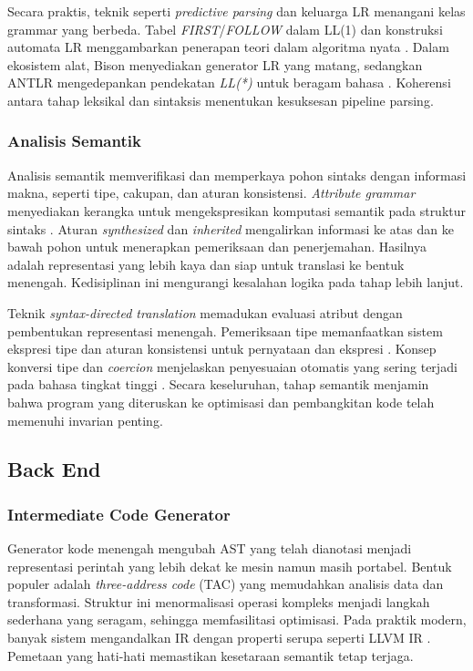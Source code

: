 \documentclass[../main.tex]{subfiles}
\begin{document}
Secara praktis, teknik seperti \emph{predictive parsing} dan keluarga LR menangani kelas grammar yang berbeda. Tabel \emph{FIRST}/\emph{FOLLOW} dalam LL(1) dan konstruksi automata LR menggambarkan penerapan teori dalam algoritma nyata \citep{WikiFirstFollow,WikiSLR,WikiLALR}. Dalam ekosistem alat, Bison menyediakan generator LR yang matang, sedangkan ANTLR mengedepankan pendekatan \emph{LL(*)} untuk beragam bahasa \citep{BisonManual,ANTLRDocs}. Koherensi antara tahap leksikal dan sintaksis menentukan kesuksesan pipeline parsing.

\subsubsection{Analisis Semantik}
Analisis semantik memverifikasi dan memperkaya pohon sintaks dengan informasi makna, seperti tipe, cakupan, dan aturan konsistensi. \emph{Attribute grammar} menyediakan kerangka untuk mengekspresikan komputasi semantik pada struktur sintaks \citep{WikiAttributeGrammar}. Aturan \emph{synthesized} dan \emph{inherited} mengalirkan informasi ke atas dan ke bawah pohon untuk menerapkan pemeriksaan dan penerjemahan. Hasilnya adalah representasi yang lebih kaya dan siap untuk translasi ke bentuk menengah. Kedisiplinan ini mengurangi kesalahan logika pada tahap lebih lanjut.

Teknik \emph{syntax-directed translation} memadukan evaluasi atribut dengan pembentukan representasi menengah. Pemeriksaan tipe memanfaatkan sistem ekspresi tipe dan aturan konsistensi untuk pernyataan dan ekspresi \citep{WikiTypeSystem,WikiTypeChecking}. Konsep konversi tipe dan \emph{coercion} menjelaskan penyesuaian otomatis yang sering terjadi pada bahasa tingkat tinggi \citep{WikiCoercion}. Secara keseluruhan, tahap semantik menjamin bahwa program yang diteruskan ke optimisasi dan pembangkitan kode telah memenuhi invarian penting.

\subsection{Back End}
\subsubsection{Intermediate Code Generator}
Generator kode menengah mengubah AST yang telah dianotasi menjadi representasi perintah yang lebih dekat ke mesin namun masih portabel. Bentuk populer adalah \emph{three-address code} (TAC) yang memudahkan analisis data dan transformasi. Struktur ini menormalisasi operasi kompleks menjadi langkah sederhana yang seragam, sehingga memfasilitasi optimisasi. Pada praktik modern, banyak sistem mengandalkan IR dengan properti serupa seperti LLVM IR \citep{LLVMOverview,WikiTAC}. Pemetaan yang hati-hati memastikan kesetaraan semantik tetap terjaga.
\end{document}
